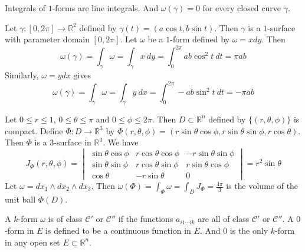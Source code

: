 \begin{remark}[example 1]
	Integrals of $1$-forms are line integrals.
	And $\omega(\gamma) = 0$ for every closed curve $\gamma$.\cite[10.12a]{rudin}
\end{remark}

\begin{remark}[example 2]
	Let $\gamma : [ 0,2\pi ] \to \mathbb{R}^2$ defined by $\gamma(t) = (a\cos t , b\sin t)$.
	Then $\gamma$ is a $1$-surface with parameter domain $[0,2\pi]$.\cite[10.12b]{rudin}
	Let $\omega$ be a $1$-form defined by $\omega = x dy$.
	Then 
	\begin{equation*}
		\omega(\gamma) = \int_\gamma \omega = \int_\gamma x\ dy = \int_0^{2\pi} ab\cos^2 t\ dt = \pi ab
	\end{equation*}
	Similarly, $\omega = ydx$ gives
	\begin{equation*}
		\omega(\gamma) = \int_\gamma \omega = \int_\gamma y\ dx = \int_0^{2\pi} -ab\sin^2 t\ dt = -\pi ab
	\end{equation*}
\end{remark}

\begin{remark}[example 3]
	Let $0 \le r \le 1$, $0 \le \theta \le \pi$ and $0 \le \phi \le 2\pi$.
	Then $D \subset \mathbb{R}^n$ defined by $\{(r,\theta,\phi)\}$ is compact.
	Define $\Phi : D \to \mathbb{R}^3$ by $\Phi(r,\theta,\phi) = (r\sin \theta \cos \phi, r\sin \theta \sin \phi, r \cos \theta)$.
	Then $\Phi$ is a $3$-surface in $\mathbb{R}^3$.
	We have
	\begin{equation*}
		J_\Phi(r,\theta,\phi) = \begin{vmatrix}
			\sin \theta \cos \phi & r\cos \theta \cos \phi & -r\sin \theta \sin \phi \\
			\sin \theta \sin \phi & r\cos \theta \sin \phi & r \sin \theta \cos \phi \\
			\cos \theta & -r\sin \theta & 0 
		\end{vmatrix} = r^2\sin \theta
	\end{equation*}
	Let $\omega = dx_1 \wedge dx_2 \wedge dx_3$.
	Then $\omega(\Phi) = \int_\Phi \omega = \int_D J_\Phi = \frac{4\pi}{3}$ is the volume of the unit ball $\Phi(D)$.
\end{remark}

\begin{remark}
	A $k$-form $\omega$ is of class $\mathscr{C}'$ or $\mathscr{C}''$ if the functions $a_{i1 \dotsm ik}$ are all of class $\mathscr{C}'$ or $\mathscr{C}''$.
	A $0$-form in $E$ is defined to be a continuous function in $E$.
	And $0$ is the only $k$-form in any open set $E \subset \mathbb{R}^n$.
\end{remark}

